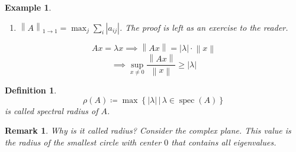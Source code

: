 \documentclass{article}
\newcounter{lecref}[section]
\numberwithin{lecref}{section}
\newtheorem{example}[lecref]{Example}
\newtheorem{definition}[lecref]{Definition}
\newtheorem*{claim}{Claim}
\newtheorem{remark}[lecref]{Remark}
\newcommand{\set}[1]{\left\{#1\right\}}
\newcommand{\setdef}[2]{\left\{\left.#1\,\right|\,#2\right\}}
\newcommand{\norm}[1]{\left\|#1\right\|}
\newcommand{\card}[1]{\left|#1\right|}
\begin{document}
\begin{example}
\begin{enumerate}
\begin{claim}
        $\norm{A}_{\infty\to\infty} = \max_i \sum_j \card{a_{ij}}$
      \end{claim}
      \begin{proof}
        Find vector $\tilde x$ such that $\norm{A\tilde x}_{\infty} = \max_i \sum_j \card{a_{ij}} \cdot \norm{\tilde x}_{\infty}$. Choose $i_0$ such that $\sum_i \card{a_{ij}} = \max!$.
        \[ \tilde x_j = \begin{cases} \frac{\card{a_{i_0 j}}}{a_{i_0 j}} & a_{i_0 j} \neq 0 \\ 0 & \text{else} \end{cases} \]
        $\tilde x_j$ are not all zero, $\card{\tilde x_j} \in \set{0,1} \forall j$.
        \begin{align*}
          (A \cdot \tilde x)_{i_0} &= \sum_j a_{i_0 j} \tilde x_j = \sum_j a_{i_0 j} a_{i_0 j} \frac{\card{a_{i_0 j}}}{a_{i_0 j}} = \sum_j \card{a_{i_0 j}} = \max_i \sum \card{a_{ij}} \\
            &\implies \norm{A \tilde x}_{\infty} \geq \card{(A \tilde x)_{i_0}} = \max_i \sum \card{a_{ij}} \cdot \underbrace{\norm{\tilde x}_{\infty}}_{=1} \\
            &\implies \norm{A}_{\infty\to\infty} \geq \max_i \sum_j \card{a_{ij}} \\
            &\implies \norm{A}_{\infty\to\infty} = \max_i \sum_j \card{a_{ij}} = \max\setdef{\norm{z_i}_1}{z_i \text{ row of } A}
        \end{align*}
      \end{proof}
    \item $\norm{A}_{1 \to 1} = \max_j \sum_i \card{a_{ij}}$.
      The proof is left as an exercise to the reader.
  \end{enumerate}
\end{example}

\[ Ax = \lambda x \implies \norm{Ax} = \card{\lambda} \cdot \norm{x} \]
\[ \implies \sup_{x \neq 0} \frac{\norm{Ax}}{\norm{x}} \geq \card{\lambda} \]

\begin{definition} %
  \[ \rho(A) \coloneqq \max \setdef{\card{\lambda}}{\lambda \in \operatorname{spec}(A)} \]
  is called \emph{spectral radius} of $A$.
\end{definition}

\begin{remark}
  Why is it called radius? Consider the complex plane. This value is the radius of the smallest circle with center $0$ that contains all eigenvalues.
\end{remark}
\end{document}

